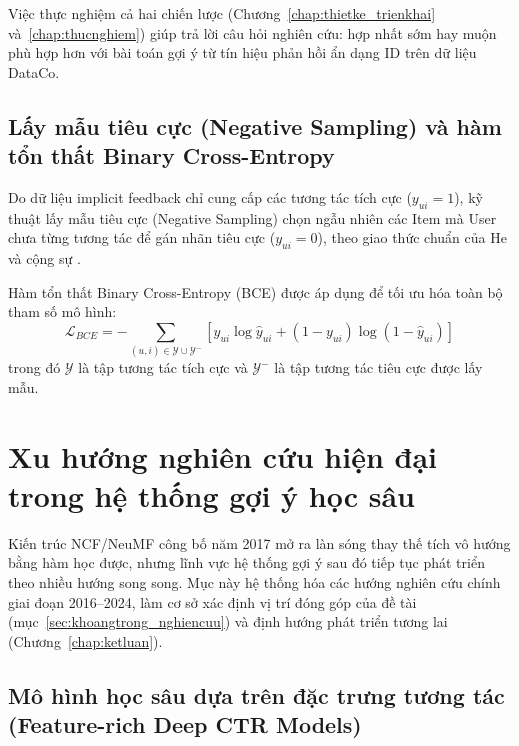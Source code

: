 Việc thực nghiệm cả hai chiến lược (Chương~\ref{chap:thietke_trienkhai} và~\ref{chap:thucnghiem}) giúp trả lời câu hỏi nghiên cứu: hợp nhất sớm hay muộn phù hợp hơn với bài toán gợi ý từ tín hiệu phản hồi ẩn dạng ID trên dữ liệu DataCo.

\subsection{Lấy mẫu tiêu cực (Negative Sampling) và hàm tổn thất Binary Cross-Entropy}
\label{subsec:negative_sampling_loss}

Do dữ liệu implicit feedback chỉ cung cấp các tương tác tích cực ($y_{ui} = 1$), kỹ thuật lấy mẫu tiêu cực (Negative Sampling) chọn ngẫu nhiên các Item mà User chưa từng tương tác để gán nhãn tiêu cực ($y_{ui} = 0$), theo giao thức chuẩn của He và cộng sự \parencite{he2017ncf}.

Hàm tổn thất Binary Cross-Entropy (BCE) được áp dụng để tối ưu hóa toàn bộ tham số mô hình:
\begin{equation}
    \mathcal{L}_{BCE} = -\sum_{(u, i) \in \mathcal{Y} \cup \mathcal{Y}^-} \left[ y_{ui} \log \hat{y}_{ui} + (1 - y_{ui}) \log (1 - \hat{y}_{ui}) \right]
    \label{eq:bce_loss}
\end{equation}
trong đó $\mathcal{Y}$ là tập tương tác tích cực và $\mathcal{Y}^-$ là tập tương tác tiêu cực được lấy mẫu.

\section{Xu hướng nghiên cứu hiện đại trong hệ thống gợi ý học sâu}
\label{sec:modern_trends}

Kiến trúc NCF/NeuMF \parencite{he2017ncf} công bố năm 2017 mở ra làn sóng thay thế tích vô hướng bằng hàm học được, nhưng lĩnh vực hệ thống gợi ý sau đó tiếp tục phát triển theo nhiều hướng song song. Mục này hệ thống hóa các hướng nghiên cứu chính giai đoạn 2016--2024, làm cơ sở xác định vị trí đóng góp của đề tài (mục~\ref{sec:khoangtrong_nghiencuu}) và định hướng phát triển tương lai (Chương~\ref{chap:ketluan}).

\subsection{Mô hình học sâu dựa trên đặc trưng tương tác (Feature-rich Deep CTR Models)}
\label{subsec:deep_ctr}

